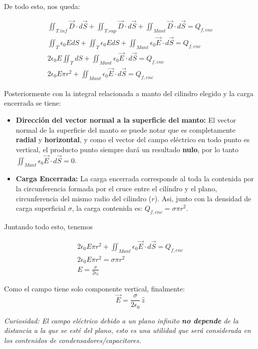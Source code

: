 \documentclass[11pt]{article}
\begin{document}
\begin{solucion}
    De todo esto, nos queda:

    \begin{gather}
        \iint_{T. inf} \vec{D} \cdot d\vec{S} + \iint_{T. sup} \vec{D} \cdot d\vec{S} + \iint_{Mant} \vec{D} \cdot d\vec{S} = Q_{f, enc}
        \\
        \iint_{T} \epsilon_0EdS + \iint_{T} \epsilon_0EdS + \iint_{Mant} \epsilon_0\vec{E} \cdot d\vec{S} = Q_{f, enc}
        \\
        2 \epsilon_0E\iint_{T}dS + \iint_{Mant} \epsilon_0\vec{E} \cdot d\vec{S} = Q_{f, enc}
        \\
        2\epsilon_0E\pi r^2 + \iint_{Mant} \epsilon_0\vec{E} \cdot d\vec{S} = Q_{f, enc}
    \end{gather}

    Posteriormente con la integral relacionada a manto del cilindro elegido y la carga encerrada se tiene:

    \begin{itemize}

        \item \textbf{Dirección del vector normal a la superficie del manto:} El vector normal de la superficie del manto se puede notar que es completamente \textbf{radial} y \textbf{horizontal}, y como el vector del campo eléctrico en todo punto es vertical, el producto punto siempre dará un resultado \textbf{nulo}, por lo tanto $\iint_{Mant} \epsilon_0\vec{E}\cdot d\vec{S} = 0$.

        \item \textbf{Carga Encerrada:} La carga encerrada corresponde al toda la contenida por la circunferencia formada por el cruce entre el cilíndro y el plano, circunferencia del mismo radio del cilindro ($r$). Asi, junto con la densidad de carga superficial $\sigma$, la carga contenida es: $Q_{f, enc} = \sigma \pi r^2$.
    \end{itemize}

    Juntando todo esto, tenemos

    \begin{gather}
        2\epsilon_0E\pi r^2 + \iint_{Mant} \epsilon_0\vec{E} \cdot d\vec{S} = Q_{f, enc}
        \\
        2\epsilon_0E\pi r^2 = \sigma \pi r^2
        \\
        E = \frac{\sigma}{2\epsilon_0}
    \end{gather}

    Como el campo tiene solo componente vertical, finalmente:
    \begin{equation}
        \vec{E} = \frac{\sigma}{2\epsilon_0} \,\hat{z}
    \end{equation}

    \textit{Curiosidad: El campo eléctrico debido a un plano infinito \textbf{no depende} de la distancia a la que se esté del plano, esto es una utilidad que será considerada en los contenidos de condensadores/capacitores.}
\end{solucion}
\end{document}
